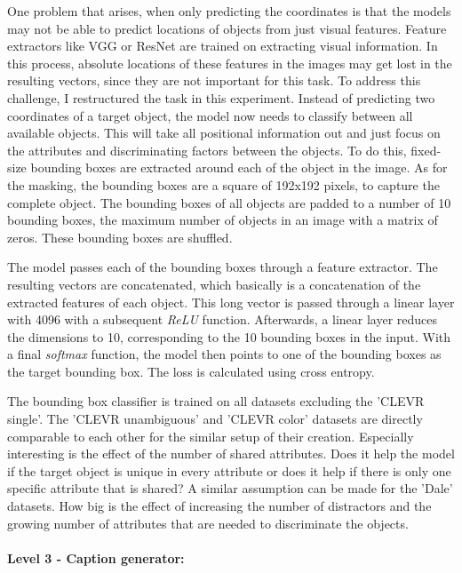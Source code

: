 One problem that arises, when only predicting the coordinates is that the models may not be able to predict locations of objects from just visual features.
Feature extractors like VGG or ResNet are trained on extracting visual information.
In this process, absolute locations of these features in the images may get lost in the resulting vectors, since they are not important for this task.
To address this challenge, I restructured the task in this experiment.
Instead of predicting two coordinates of a target object, the model now needs to classify between all available objects.
This will take all positional information out and just focus on the attributes and discriminating factors between the objects.
To do this, fixed-size bounding boxes are extracted around each of the object in the image.
As for the masking, the bounding boxes are a square of 192x192 pixels, to capture the complete object. 
The bounding boxes of all objects are padded to a number of 10 bounding boxes, the maximum number of objects in an image with a matrix of zeros.
These bounding boxes are shuffled.

The model passes each of the bounding boxes through a feature extractor.
The resulting vectors are concatenated, which basically is a concatenation of the extracted features of each object.
This long vector is passed through a linear layer with 4096 with a subsequent \emph{ReLU} function.
Afterwards, a linear layer reduces the dimensions to 10, corresponding to the 10 bounding boxes in the input.
With a final \emph{softmax} function, the model then points to one of the bounding boxes as the target bounding box.
The loss is calculated using cross entropy.

The bounding box classifier is trained on all datasets excluding the 'CLEVR single'.
The 'CLEVR unambiguous' and 'CLEVR color' datasets are directly comparable to each other for the similar setup of their creation.
Especially interesting is the effect of the number of shared attributes. Does it help the model if the target object is unique in every attribute or does it help if there is only one specific attribute that is shared?
A similar assumption can be made for the 'Dale' datasets. How big is the effect of increasing the number of distractors and the growing number of attributes that are needed to discriminate the objects.

\paragraph{Level 3 - Caption generator:}

